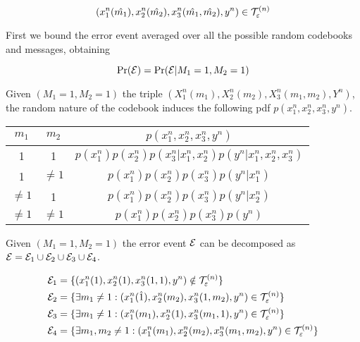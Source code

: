 \begin{equation}
	(x_1^n(\hat{m_1}),x_2^n(\hat{m_2}), x_3^n(\hat{m_1}, \hat{m_2}), y^n) \in \mathcal{T}_\varepsilon^{(n)}{}
	\label{eq:sentcond}
\end{equation}

First we bound the error event averaged over all the possible random codebooks and messages, obtaining

\begin{equation}
	\Pr(\mathcal{E})=\Pr(\mathcal{E} | M_1=1,M_2=1)
	\label{eq:boundep}
\end{equation}

Given $(M_1=1,M_2=1)$ the triple $(X_1^n(m_1),X_2^n(m_2), X_3^n(m_1,m_2),Y^n)$, the random nature of the codebook induces the following pdf $p(x_1^n,x_2^n,x_3^n,y^n)$.

\begin{center}
    \begin{tabular}{ | c | c | c |}
    \hline
		$m_1$ & $m_2$ & $p(x_1^n,x_2^n,x_3^n,y^n)$ \\ \hline
		1 & 1 & $p(x_1^n)p(x_2^n)p(x_3^n|x_1^n,x_2^n)p(y^n|x_1^n,x_2^n,x_3^n)$ \\ \hline
    1 & $\neq 1$ & $p(x_1^n)p(x_2^n)p(x_3^n)p(y^n|x_1^n)$ \\ \hline
    $\neq 1$ & 1 & $p(x_1^n)p(x_2^n)p(x_3^n)p(y^n|x_2^n)$ \\ \hline
		$\neq 1$ & $\neq 1$ & $p(x_1^n)p(x_2^n)p(x_3^n)p(y^n)$ \\ \hline
    \end{tabular}
\end{center}

Given $(M_1=1,M_2=1)$ the error event $\mathcal{E}$ can be decomposed as $\mathcal{E} = \mathcal{E}_1 \cup \mathcal{E}_2 \cup \mathcal{E}_3 \cup \mathcal{E}_4$.

\begin{equation}
	\begin{split}
		\mathcal{E}_1 &= \{ (x_1^n(1),x_2^n(1), x_3^n(1,1), y^n) \notin \mathcal{T}_\varepsilon^{(n)}{} \} \\
		\mathcal{E}_2 &= \{\exists m_1 \neq 1 : (x_1^n(\hat{1}),x_2^n({m_2}), x_3^n(1,m_2), y^n) \in \mathcal{T}_\varepsilon^{(n)}{} \} \\
		\mathcal{E}_3 &= \{\exists m_1 \neq 1 : (x_1^n({m_1}),x_2^n(1), x_3^n({m_1},1), y^n) \in \mathcal{T}_\varepsilon^{(n)}{} \} \\
		\mathcal{E}_4 &= \{\exists m_1,m_2 \neq 1 : (x_1^n({m_1}),x_2^n({m_2}), x_3^n({m_1},{m_2} ), y^n) \in \mathcal{T}_\varepsilon^{(n)}{} \} \\
	\end{split}
\end{equation}

